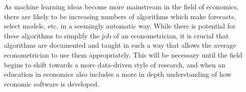As machine learning ideas become more mainstream in the field of economics, there are likely to be increasing numbers of algorithms which make forecasts, select models, etc. in a seemingly automatic way. While there is potential for these algorithms to simplify the job of an econometrician, it is crucial that algorithms are documented and taught in such a way that allows the average econometrician to use them appropriately. This will be necessary until the field begins to shift towards a more data-driven style of research, and when an education in economics also includes a more in depth understanding of how economic software is developed.




